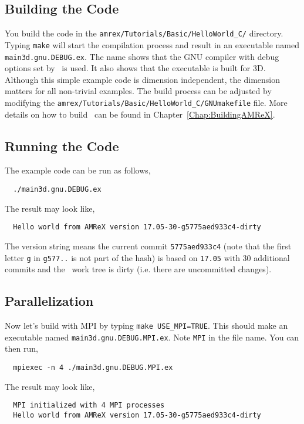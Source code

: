 \subsection{Building the Code}

You build the code in the {\tt amrex/Tutorials/Basic/HelloWorld\_C/}
directory.  Typing {\tt make} will start the compilation process and
result in an executable named {\tt main3d.gnu.DEBUG.ex}.  The name
shows that the GNU compiler with debug options set by \amrex\ is used.
It also shows that the executable is built for 3D.  Although this
simple example code is dimension independent, the dimension matters
for all non-trivial examples.  The build process can be adjusted by
modifying the {\tt amrex/Tutorials/Basic/HelloWorld\_C/GNUmakefile} file.
More details on how to build \amrex\ can be found in
Chapter~\ref{Chap:BuildingAMReX}.

\subsection{Running the Code}

The example code can be run as follows,
\begin{verbatim}
  ./main3d.gnu.DEBUG.ex
\end{verbatim}
The result may look like,
\begin{verbatim}
  Hello world from AMReX version 17.05-30-g5775aed933c4-dirty
\end{verbatim}
The version string means the current commit {\tt 5775aed933c4} (note
that the first letter {\tt g} in {\tt g577..} is not part of the hash)
is based on {\tt 17.05} with 30 additional commits and the \amrex\
work tree is dirty (i.e. there are uncommitted changes).

\subsection{Parallelization}

Now let's build with MPI by typing {\tt make USE\_MPI=TRUE}.  This
should make an executable named {\tt main3d.gnu.DEBUG.MPI.ex}.  Note
{\tt MPI} in the file name.  You can then run,
\begin{verbatim}
  mpiexec -n 4 ./main3d.gnu.DEBUG.MPI.ex
\end{verbatim}
The result may look like,
\begin{verbatim}
  MPI initialized with 4 MPI processes
  Hello world from AMReX version 17.05-30-g5775aed933c4-dirty
\end{verbatim}

